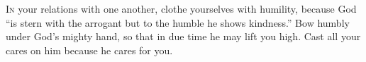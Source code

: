 
\lettrine{I}{n} your relations with one another, clothe yourselves with humility, because God “is stern with the arrogant but to the humble he shows kindness.” Bow humbly under God’s mighty hand, so that in due time he may lift you high. Cast all your cares on him because he cares for you.